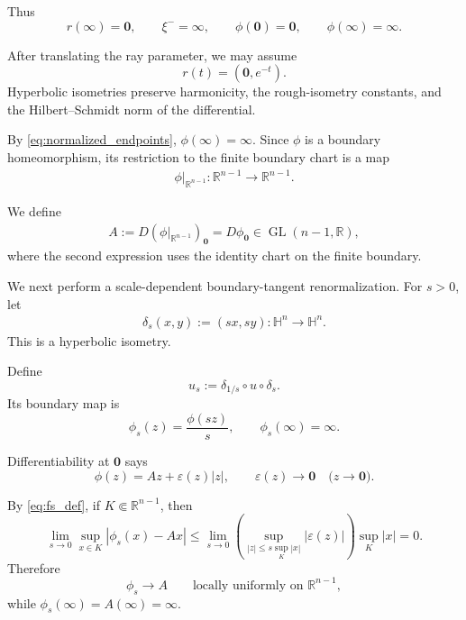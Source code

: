 \documentclass[11pt]{amsart}
\theoremstyle{plain}
\theoremstyle{plain}
\theoremstyle{plain}
\newcommand{\Hn}{\mathbb H^n}
\newcommand{\R}{\mathbb R}
\numberwithin{equation}{section}
\begin{document}
Thus
\begin{equation}\label{eq:normalized_endpoints}
r(\infty)=\mathbf{0},
\qquad
\xi^{-}=\infty,
\qquad
\phi(\mathbf{0})
=\mathbf{0},
\qquad
\phi(\infty)=\infty.
\end{equation}

After translating the ray parameter, we may assume
\begin{equation}\label{eq:vertical_ray}
r(t)=(\mathbf{0},e^{-t}).
\end{equation}
Hyperbolic isometries preserve harmonicity, the rough-isometry constants,
and the Hilbert--Schmidt norm of the differential.


By \eqref{eq:normalized_endpoints}, \(\phi(\infty)=\infty\).  Since
\(\phi\) is a boundary homeomorphism, its restriction to the finite
boundary chart is a map
\begin{align}
\phi|_{\R^{n-1}}:
\R^{n-1}\longrightarrow\R^{n-1}.
\nonumber
\end{align}


We define
\begin{align}
A
:=
D\left(\phi|_{\R^{n-1}}\right)_{\mathbf{0}}
=
D\phi_{\mathbf{0}}
\in\operatorname{GL}(n-1,\R),
\nonumber
\end{align}
where the second expression uses the identity chart on the finite boundary.


We next perform a scale-dependent boundary-tangent renormalization.
For \(s>0\), let
\begin{align}
\delta_s(x,y):=(sx,sy):\Hn\longrightarrow\Hn.
\nonumber
\end{align}
This is a hyperbolic isometry.

Define
\begin{equation}\label{eq:Us_def}
u_s:=\delta_{1/s}\circ u\circ\delta_s.
\end{equation}
Its boundary map is
\begin{equation}\label{eq:fs_def}
\phi_s(z)=\frac{\phi(sz)}s,
\qquad
\phi_s(\infty)=\infty.
\end{equation}

Differentiability at \(\mathbf{0}\) says
\[
\phi(z)=Az+\varepsilon(z)|z|,
\qquad
\varepsilon(z)\longrightarrow
\mathbf{0}
\quad
\bigl(z\to\mathbf{0}\bigr).
\]

By \eqref{eq:fs_def}, if \(K\Subset\R^{n-1}\), then
\[
\lim_{s\rightarrow 0}\sup_{x\in K}|\phi_s(x)-Ax| \leq \lim_{s\rightarrow 0}\left(\sup_{|z|\leq s\sup_K|x|}|\varepsilon(z)|\right)\sup_K|x| =0.
\]
Therefore
\begin{equation}\label{eq:fs_to_A}
\phi_s\longrightarrow A
\qquad\text{locally uniformly on }\R^{n-1},
\end{equation}
while \(\phi_s(\infty)=A(\infty)=\infty\).  
\end{document}
